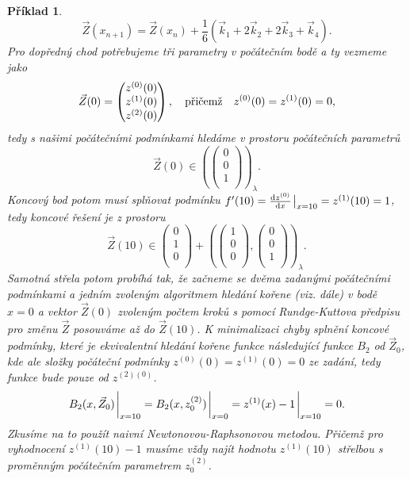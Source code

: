 \documentclass{article}
\newtheorem{example}{Příklad}
\begin{document}
\begin{example}
\begin{equation}
		\vec{Z}(x_{n+1}) = \vec{Z}(x_{n}) + \frac{1}{6}  \left(\vec{k}_{1} +  2\vec{k}_{2} + 2\vec{k}_{3} + \vec{k}_{4} \right).
	\end{equation}
	Pro dopředný chod potřebujeme tři parametry v počátečním bodě a ty vezmeme jako
	\begin{equation}
		\vec{Z}(0) =
		\begin{pmatrix}
			z^{(0)}(0) \\
			z^{(1)}(0) \\
			z^{(2)}(0)
		\end{pmatrix},  \qq{přičemž} z^{(0)}(0) = z^{(1)}(0) = 0,
	\end{equation}
	tedy s našimi počátečními podmínkami hledáme v prostoru počátečních parametrů
	\begin{equation}
		\vec{Z}(0) \in \left(
		\begin{pmatrix}
			0 \\
			0 \\
			1 \\
		\end{pmatrix}
		\right)_{\lambda}.
	\end{equation}
	Koncový bod potom musí splňovat podmínku $f'(10) = \dv{z^{(0)}}{x}\eval_{x=10} = z^{(1)}(10) = 1$, tedy koncové řešení je z prostoru
	\begin{equation}
		\vec{Z}(10) \in
		\begin{pmatrix}
			0 \\
			1 \\
			0 \\
		\end{pmatrix}  +
		\left(
		\begin{pmatrix}
			1 \\
			0 \\
			0 \\
		\end{pmatrix},
		\begin{pmatrix}
			0 \\
			0 \\
			1 \\
		\end{pmatrix}
		\right)_{\lambda}.
	\end{equation}
	Samotná střela potom probíhá tak, že začneme se dvěma zadanými počátečními podmínkami a jedním zvoleným algoritmem hledání kořene (viz. dále) v bodě $x = 0$ a vektor $\vec{Z}(0)$ zvoleným počtem kroků s pomocí Rundge-Kuttova předpisu pro změnu $\vec{Z}$ posouváme až do $\vec{Z}(10)$.
	\medskip
	K minimalizaci chyby splnění koncové podmínky, které je ekvivalentní hledání kořene funkce následující funkce $B_{2}$ od $\vec{Z}_{0}$, kde ale složky počáteční podmínky $z^{(0)}(0) = z^{(1)}(0) = 0$ ze zadání, tedy funkce bude pouze od $z^{(2)(0)}$.
	\begin{equation}
		B_{2}(x, \vec{Z}_{0}) \eval_{x = 10}= B_{2}(x, z^{(2)}_{0}) \eval_{x=0}= z^{(1)}(x) - 1 \eval_{x=10}= 0.
	\end{equation}
	Zkusíme na to použít naivní Newtonovou-Raphsonovou metodou. Přičemž pro vyhodnocení $z^{(1)}(10) - 1$ musíme vždy najít hodnotu $z^{(1)}(10)$ střelbou s proměnným počátečním parametrem $z^{(2)}_{0}$.


\end{example}
\end{document}
